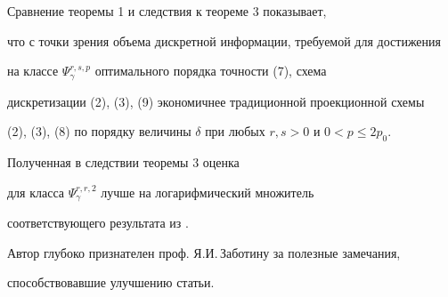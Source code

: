 \begin{note} Сравнение теоремы 1 и следствия к теореме 3 показывает,


что с точки зрения объема дискретной информации, требуемой для  достижения


на классе $\Psi^{r,s,p}_\gamma$ оптимального порядка точности (7), схема


дискретизации (2), (3), (9) экономичнее  традиционной  проекционной  схемы


(2), (3), (8) по порядку величины $\delta$ при любых $r,s>0$ и $0<p\le 2p_0$.


\end{note}





\begin{note} Полученная в следствии теоремы 3  оценка


для класса $\Psi^{r,r,2}_\gamma$ лучше на логарифмический множитель


соответствующего результата из \cite{P}.


\end{note}





Автор глубоко признателен проф. Я.И.\,Заботину за полезные замечания,


способствовавшие улучшению статьи.





